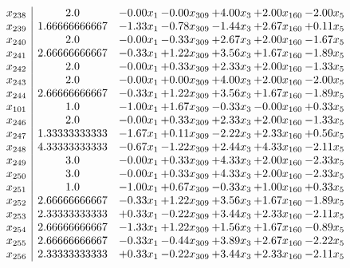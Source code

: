 \documentclass[8pt]{article}
\begin{document}
\[\begin{array}{c| c c@{\hskip 2pt} c@{\hskip 2pt} c@{\hskip 2pt} c@{\hskip 2pt} c@{\hskip 2pt} }
 x_{238}   &  2.0 & -0.00 x_{1} & -0.00 x_{309} & +  4.00 x_{3} & +  2.00 x_{160} & -2.00 x_{5}\\
 x_{239}   &  1.66666666667 & -1.33 x_{1} & -0.78 x_{309} & -1.44 x_{3} & +  2.67 x_{160} & +  0.11 x_{5}\\
 x_{240}   &  2.0 & -0.00 x_{1} & -0.33 x_{309} & +  2.67 x_{3} & +  2.00 x_{160} & -1.67 x_{5}\\
 x_{241}   &  2.66666666667 & -0.33 x_{1} & +  1.22 x_{309} & +  3.56 x_{3} & +  1.67 x_{160} & -1.89 x_{5}\\
 x_{242}   &  2.0 & -0.00 x_{1} & +  0.33 x_{309} & +  2.33 x_{3} & +  2.00 x_{160} & -1.33 x_{5}\\
 x_{243}   &  2.0 & -0.00 x_{1} & +  0.00 x_{309} & +  4.00 x_{3} & +  2.00 x_{160} & -2.00 x_{5}\\
 x_{244}   &  2.66666666667 & -0.33 x_{1} & +  1.22 x_{309} & +  3.56 x_{3} & +  1.67 x_{160} & -1.89 x_{5}\\
 x_{101}   &  1.0 & -1.00 x_{1} & +  1.67 x_{309} & -0.33 x_{3} & -0.00 x_{160} & +  0.33 x_{5}\\
 x_{246}   &  2.0 & -0.00 x_{1} & +  0.33 x_{309} & +  2.33 x_{3} & +  2.00 x_{160} & -1.33 x_{5}\\
 x_{247}   &  1.33333333333 & -1.67 x_{1} & +  0.11 x_{309} & -2.22 x_{3} & +  2.33 x_{160} & +  0.56 x_{5}\\
 x_{248}   &  4.33333333333 & -0.67 x_{1} & -1.22 x_{309} & +  2.44 x_{3} & +  4.33 x_{160} & -2.11 x_{5}\\
 x_{249}   &  3.0 & -0.00 x_{1} & +  0.33 x_{309} & +  4.33 x_{3} & +  2.00 x_{160} & -2.33 x_{5}\\
 x_{250}   &  3.0 & -0.00 x_{1} & +  0.33 x_{309} & +  4.33 x_{3} & +  2.00 x_{160} & -2.33 x_{5}\\
 x_{251}   &  1.0 & -1.00 x_{1} & +  0.67 x_{309} & -0.33 x_{3} & +  1.00 x_{160} & +  0.33 x_{5}\\
 x_{252}   &  2.66666666667 & -0.33 x_{1} & +  1.22 x_{309} & +  3.56 x_{3} & +  1.67 x_{160} & -1.89 x_{5}\\
 x_{253}   &  2.33333333333 & +  0.33 x_{1} & -0.22 x_{309} & +  3.44 x_{3} & +  2.33 x_{160} & -2.11 x_{5}\\
 x_{254}   &  2.66666666667 & -1.33 x_{1} & +  1.22 x_{309} & +  1.56 x_{3} & +  1.67 x_{160} & -0.89 x_{5}\\
 x_{255}   &  2.66666666667 & -0.33 x_{1} & -0.44 x_{309} & +  3.89 x_{3} & +  2.67 x_{160} & -2.22 x_{5}\\
 x_{256}   &  2.33333333333 & +  0.33 x_{1} & -0.22 x_{309} & +  3.44 x_{3} & +  2.33 x_{160} & -2.11 x_{5}\\

\end{array}\]
\end{document}

